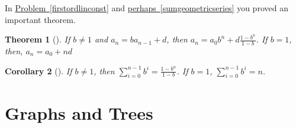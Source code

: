 \documentclass[10pt,]{book}
\theoremstyle{plain}
\newtheorem{theorem}{Theorem}[section]
\newtheorem{corollary}[theorem]{Corollary}
\theoremstyle{definition}
\theoremstyle{definition}
\numberwithin{equation}{chapter}
\begin{document}
In \hyperref[firstordlinconst]{Problem~\ref{firstordlinconst}} and \hyperref[sumgeometricseries]{perhaps~\ref{sumgeometricseries}} you proved an important theorem.%
\begin{theorem}[{}]\label{theorem-2}
If \(b\not=1\) and \(a_n=ba_{n-1} +d\), then \(\displaystyle a_n =
a_0b^n + d\frac{1-b^n}{1-b}\). If \(b=1\), then, \(\displaystyle a_n =
a_0 +nd\)%
\end{theorem}
\begin{corollary}[{}]\label{corollary-1}
If \(b\not=1\), then \(\displaystyle \sum_{i=0}^{n-1}b^i =
\frac{1-b^n}{1-b}\). If \(b=1\), \(\displaystyle \sum_{i=0}^{n-1}b^i =n\).%
\end{corollary}
\typeout{************************************************}
\typeout{************************************************}
\section[{Graphs and Trees}]{Graphs and Trees}\label{sec_induction-graphstrees}
\typeout{************************************************}
\typeout{************************************************}
\end{document}
